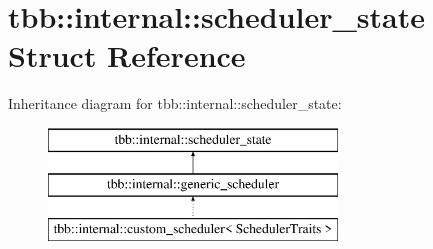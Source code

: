 \hypertarget{structtbb_1_1internal_1_1scheduler__state}{}\section{tbb\+:\+:internal\+:\+:scheduler\+\_\+state Struct Reference}
\label{structtbb_1_1internal_1_1scheduler__state}
Inheritance diagram for tbb\+:\+:internal\+:\+:scheduler\+\_\+state\+:\begin{figure}[H]
\begin{center}
\leavevmode
\includegraphics[height=3.000000cm]{structtbb_1_1internal_1_1scheduler__state}
\end{center}
\end{figure}
